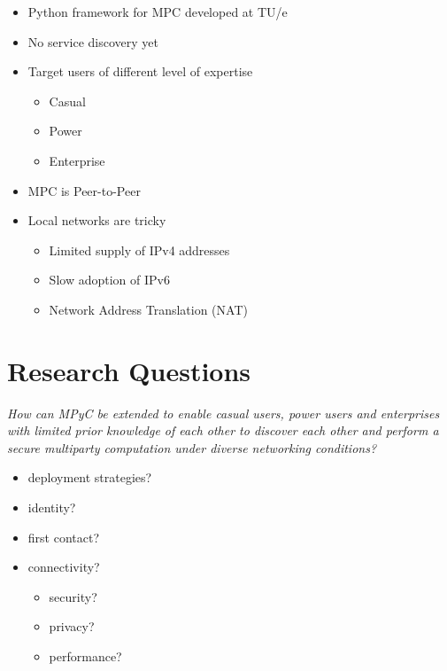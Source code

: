 \begin{itemize}
\tightlist
\item
  Python framework for MPC developed at TU/e
\item
  No service discovery yet
\item
  Target users of different level of expertise

  \begin{itemize}
  \tightlist
  \item
    Casual
  \item
    Power
  \item
    Enterprise
  \end{itemize}
\item
  MPC is Peer-to-Peer
\item
  Local networks are tricky

  \begin{itemize}
  \tightlist
  \item
    Limited supply of IPv4 addresses
  \item
    Slow adoption of IPv6
  \item
    Network Address Translation (NAT)
  \end{itemize}
\end{itemize}

\hypertarget{research-questions}{%
\chapter{Research Questions}\label{research-questions}}

\emph{How can MPyC be extended to enable casual users, power users and
enterprises with limited prior knowledge of each other to discover each
other and perform a secure multiparty computation under diverse
networking conditions?}

\begin{itemize}
\tightlist
\item
  deployment strategies?
\item
  identity?
\item
  first contact?
\item
  connectivity?

  \begin{itemize}
  \tightlist
  \item
    security?
  \item
    privacy?
  \item
    performance?
  \end{itemize}
\end{itemize}

